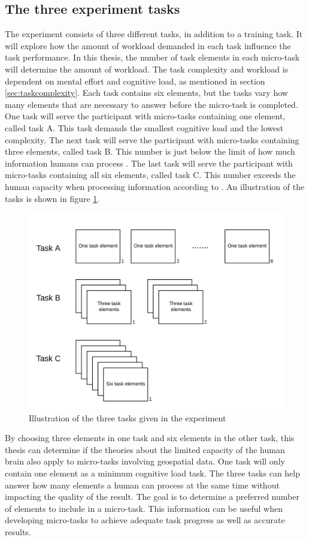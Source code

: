 \subsection{The three experiment tasks}\label{sec:experimenttasks}
The experiment consists of three different tasks, in addition to a training task. It will explore how the amount of workload demanded in each task influence the task performance. In this thesis, the number of task elements in each micro-task will determine the amount of workload. The task complexity and workload is dependent on mental effort and cognitive load, as mentioned in section \ref{sec:taskcomplexity}. Each task contains six elements, but the tasks vary how many elements that are necessary to answer before the micro-task is completed. One task will serve the participant with micro-tasks containing one element, called task A. This task demands the smallest cognitive load and the lowest complexity. The next task will serve the participant with micro-tasks containing three elements, called task B. This number is just below the limit of how much information humans can process \citep{Mandler2013}. The last task will serve the participant with micro-tasks containing all six elements, called task C. This number exceeds the human capacity when processing information according to \cite{Leppink2014a}. An illustration of the tasks is shown in figure \ref{fig:illustrationmicrotasks}.

\begin{figure}[H]
	\centering
	\includegraphics[width=0.7\linewidth]{fig/illustration_microtasks}
	\caption{Illustration of the three tasks given in the experiment}
	\label{fig:illustrationmicrotasks}
\end{figure}

By choosing three elements in one task and six elements in the other task, this thesis can determine if the theories about the limited capacity of the human brain also apply to micro-tasks involving geospatial data. One task will only contain one element as a minimum cognitive load task. The three tasks can help answer how many elements a human can process at the same time without impacting the quality of the result. The goal is to determine a preferred number of elements to include in a micro-task. This information can be useful when developing micro-tasks to achieve adequate task progress as well as accurate results.

